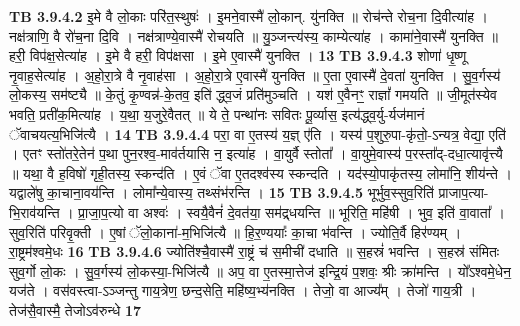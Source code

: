 \documentclass[17pt]{extarticle}
\begin{document}
{{{{{{{{{{{{{{{{{{{{{{                  \newline
                                \textbf{ TB 3.9.4.2} \newline
                  इ॒मे वै लो॒काः परि॑त॒स्थुषः॑ । इ॒मने॒वास्मै॑ लो॒कान्. यु॑नक्ति ॥ रोच॑न्ते रोच॒ना दि॒वीत्या॑ह । नक्ष॑त्राणि॒ वै रो॑च॒ना दि॒वि । नक्ष॑त्राण्ये॒वास्मै॑ रोचयति ॥ यु॒ञ्जन्त्य॑स्य॒ काम्येत्या॑ह । कामा॑ने॒वास्मै॑ युनक्ति ॥ हरी॒ विप॑क्ष॒सेत्या॑ह । इ॒मे वै हरी॒ विप॑क्षसा । इ॒मे ए॒वास्मै॑ युनक्ति । \textbf{ 13} \newline
                  \newline
                                \textbf{ TB 3.9.4.3} \newline
                  शोणा॑ धृ॒ष्णू नृ॒वाह॒सेत्या॑ह । अ॒हो॒रा॒त्रे वै नृ॒वाह॑सा । अ॒हो॒रा॒त्रे ए॒वास्मै॑ युनक्ति ॥ ए॒ता ए॒वास्मै॑ दे॒वता॑ युनक्ति । सु॒व॒र्गस्य॑ लो॒कस्य॒ सम॑ष्ट्यै ॥ के॒तुं कृ॒ण्वन्न॑-के॒तव॒ इति॑ द्ध्व॒जं प्रति॑मुञ्चति । यश॑ ए॒वैनꣳ॒॒ राज्ञां᳚ गमयति ॥ जी॒मूत॑स्येव भवति॒ प्रती॑क॒मित्या॑ह । य॒था॒ य॒जुरे॒वैतत् ॥ ये ते॒ पन्था॑नः सवितः पू॒र्व्यास॒ इत्य॑द्ध्व॒र्यु-र्यज॑मानं ॅवाचयत्य॒भिजि॑त्यै । \textbf{ 14} \newline
                  \newline
                                \textbf{ TB 3.9.4.4} \newline
                  परा॒ वा ए॒तस्य॑ य॒ज्ञ् ए॑ति । यस्य॑ प॒शुरु॒पा-कृ॑तो॒-ऽन्यत्र॒ वेद्या॒ एति॑ । एतꣳ स्तो॑तरे॒तेन॑ प॒था पुन॒रश्व॒-माव॑र्तयासि न॒ इत्या॑ह । वा॒युर्वै स्तोता᳚ । वा॒युमे॒वास्य॑ प॒रस्ता᳚द्-दधा॒त्यावृ॑त्त्यै ॥ यथा॒ वै ह॒विषो॑ गृही॒तस्य॒ स्कन्द॑ति । ए॒वं ॅवा ए॒तदश्व॑स्य स्कन्दति । यद॑स्यो॒पाकृ॑तस्य॒ लोमा॑नि॒ शीय॑न्ते । यद्वाले॑षु का॒चाना॒वय॑न्ति । लोमा᳚न्ये॒वास्य॒ तथ्संभ॑रन्ति । \textbf{ 15} \newline
                  \newline
                                \textbf{ TB 3.9.4.5} \newline
                  भूर्भुव॒स्सुव॒रिति॑ प्राजाप॒त्या-भि॒राव॑यन्ति । प्रा॒जा॒प॒त्यो वा अश्वः॑ । स्वयै॒वैनं॑ दे॒वत॑या॒ सम॑द्र्धयन्ति ॥ भूरिति॒ महि॑षी । भुव॒ इति॑ वा॒वाता᳚ । सुव॒रिति॑ परिवृ॒क्ती । ए॒षां ॅलो॒काना॑-म॒भिजि॑त्यै ॥ हि॒र॒ण्ययाः᳚ का॒चा भ॑वन्ति । ज्योति॒र्वै हिर॑ण्यम् । रा॒ष्ट्रम॑श्वमे॒धः \textbf{ 16} \newline
                  \newline
                                \textbf{ TB 3.9.4.6} \newline
                  ज्योति॑श्चै॒वास्मै॑ रा॒ष्ट्रं च॑ स॒मीची॑ दधाति ॥ स॒हस्रं॑ भवन्ति । स॒हस्र॑ संमितः सुव॒र्गो लो॒कः । सु॒व॒र्गस्य॑ लो॒कस्या॒-भिजि॑त्यै ॥ अप॒ वा ए॒तस्मा॒त्तेज॑ इन्द्रि॒यं प॒शवः॒ श्रीः क्रा॑मन्ति । यो᳚ऽश्वमे॒धेन॒ यज॑ते । वस॑वस्त्वा-ऽञ्जन्तु गाय॒त्रेण॒ छन्द॒सेति॒ महि॑ष्य॒भ्य॑नक्ति । तेजो॒ वा आज्य᳚म् । तेजो॑ गाय॒त्री । तेज॑सै॒वास्मै॒ तेजोऽव॑रुन्धे \textbf{ 17} \newline
}}}}}}}}}}}}}}}}}}}}}}
\end{document}
